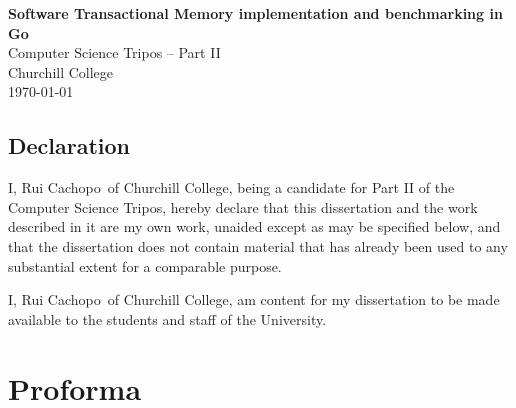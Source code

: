 \documentclass[12pt,a4paper,oneside,openright]{report}
\newcommand{\disstitle}{Software Transactional Memory implementation
  and benchmarking in Go}
\newcommand{\college}{Churchill College}
\newcommand{\studentname}{Rui Cachopo}
\begin{document}


\pagestyle{empty}


\rightline{\LARGE \textbf{\studentname}}

\vspace*{60mm}
\begin{center}
  \Huge
  \textbf{\disstitle} \\[5mm]
  Computer Science Tripos -- Part II \\[5mm]
  \college \\[5mm]
  \today
\end{center}

\newpage

\section*{Declaration}

I, \studentname\ of \college, being a candidate for Part II of the
Computer Science Tripos, hereby declare that this dissertation and the
work described in it are my own work, unaided except as may be
specified below, and that the dissertation does not contain material
that has already been used to any substantial extent for a comparable
purpose.

I, \studentname\ of \college, am content for my dissertation to be
made available to the students and staff of the University.

\bigskip {}

\medskip {}


\chapter*{\vspace{-1.2in} Proforma \vspace{-0.3in}}

\thispagestyle{empty}

\vspace{-0.2in}
\end{document}
